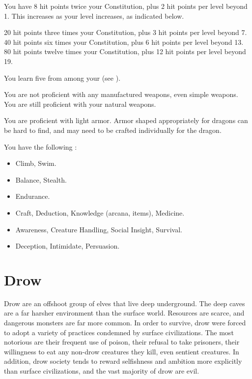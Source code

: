       You have 8 hit points \add twice your Constitution, plus 2 hit points per level beyond 1.
      This increases as your level increases, as indicated below.
      \begin{itemize}
         20 hit points \add three times your Constitution, plus 3 hit points per level beyond 7.
         40 hit points \add six times your Constitution, plus 6 hit points per level beyond 13.
         80 hit points \add twelve times your Constitution, plus 12 hit points per level beyond 19.
      \end{itemize}

      You learn five  from among your  (see ).

      You are not proficient with any manufactured weapons, even simple weapons.
      You are still proficient with your natural weapons.

      You are proficient with light armor.
      Armor shaped appropriately for dragons can be hard to find, and may need to be crafted individually for the dragon.

      You have the following :
      \begin{itemize}
        \item {} Climb, Swim.
        \item {} Balance, Stealth.
        \item {} Endurance.
        \item {} Craft, Deduction, Knowledge (arcana, items), Medicine.
        \item {} Awareness, Creature Handling, Social Insight, Survival.
        \item {} Deception, Intimidate, Persuasion.
      \end{itemize}

\section{Drow}

  Drow are an offshoot group of elves that live deep underground.
  The deep caves are a far harsher environment than the surface world.
  Resources are scarce, and dangerous monsters are far more common.
  In order to survive, drow were forced to adopt a variety of practices condemned by surface civilizations.
  The most notorious are their frequent use of poison, their refusal to take prisoners, their willingness to eat any non-drow creatures they kill, even sentient creatures.
  In addition, drow society tends to reward selfishness and ambition more explicitly than surface civilizations, and the vast majority of drow are evil.

